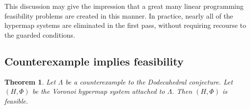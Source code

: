 \documentclass{article} %
\newtheorem{theorem}{Theorem}[section]
\begin{document}

This discussion may give the impression 
that a great many linear programming feasibility
problems are created in this manner.  In practice, nearly all
of the hypermap systems are eliminated in the first pass, without
requiring recourse to the guarded conditions.  

\subsection{Counterexample implies feasibility}

\begin{theorem}\label{thm:feasible}  Let $\Lambda$ be a counterexample to the Dodecahedral conjecture.  Let $(H,\Phi)$ be the Voronoi hypermap system attached to $\Lambda$.
Then $(H,\Phi)$ is feasible.
\end{theorem}
\end{document}
